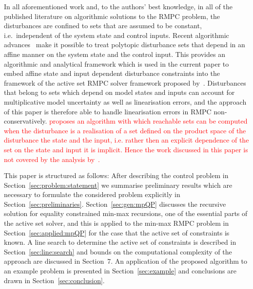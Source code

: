 \documentclass{ifacconf}
\begin{document}
In all aforementioned work and, to the authors' best knowledge, in all of the published literature on algorithmic
solutions to the RMPC problem, the disturbances are confined to sets that are assumed to be constant,
i.e.~independent of the system state and control inputs. Recent algorithmic advances~\citep{Schaich:2015}
make it possible to treat polytopic disturbance sets that depend in an affine manner on the system state and the control
input. This provides an algorithmic and analytical framework which is used in the
current paper to embed affine state and input dependent disturbance constraints into the framework of the
active set RMPC solver framework proposed by~\cite{Buerger:2011}. Disturbances that belong to sets which depend
on model states and inputs can account for multiplicative model uncertainty as well as linearisation
errors, and the approach of this paper is therefore able to handle linearisation errors in RMPC non-conservatively.
\textcolor{red}{\cite{Rakovic:2006} proposes an algorithm with which reachable sets can be computed when the disturbance
is a realisation of a set defined on the product space of the disturbance the state and the input, i.e. rather
then an explicit dependence of the set on the state and input it is implicit. Hence the work discussed in
this paper is not covered by the analysis by~\cite{Rakovic:2006}.}

This paper is structured as follows: 
After describing the control problem in Section~\ref{sec:problem:statement} we summarise preliminary 
results which are necessary to formulate the considered problem explicitly in Section~\ref{sec:preliminaries}.
Section~\ref{sec:gen:mpQP} discusses the recursive solution for equality constrained min-max recursions, one of 
the essential parts of the active set solver, and this is applied to the min-max RMPC problem in Section~\ref{sec:applied:mpQP}
for the case that the active set of constraints is known. A line search to determine the active set of
constraints is described 
in Section~\ref{sec:line:search} and bounds on the computational complexity of the approach are discussed in
Section~7. An application of the proposed algorithm to an example problem is presented in 
Section~\ref{sec:example} and conclusions are drawn in Section~\ref{sec:conclusion}.
\end{document}
